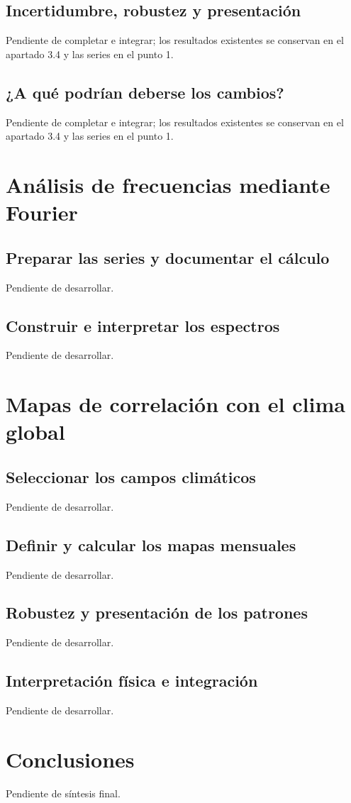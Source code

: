 \documentclass[10pt,a4paper]{article}
\begin{document}
\subsection{Incertidumbre, robustez y presentación}
Pendiente de completar e integrar; los resultados existentes se conservan en el apartado 3.4 y las series en el punto 1.
\subsection{¿A qué podrían deberse los cambios?}
Pendiente de completar e integrar; los resultados existentes se conservan en el apartado 3.4 y las series en el punto 1.
\clearpage
\section{Análisis de frecuencias mediante Fourier}
\subsection{Preparar las series y documentar el cálculo}
Pendiente de desarrollar.
\subsection{Construir e interpretar los espectros}
Pendiente de desarrollar.
\clearpage
\section{Mapas de correlación con el clima global}
\subsection{Seleccionar los campos climáticos}
Pendiente de desarrollar.
\subsection{Definir y calcular los mapas mensuales}
Pendiente de desarrollar.
\subsection{Robustez y presentación de los patrones}
Pendiente de desarrollar.
\subsection{Interpretación física e integración}
Pendiente de desarrollar.
\section*{Conclusiones}
Pendiente de síntesis final.
\end{document}
